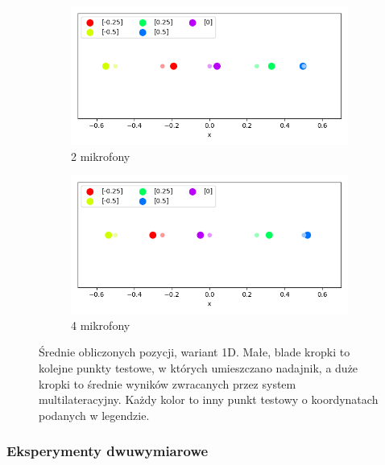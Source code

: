 \begin{figure}[H]
    \centering
    \begin{subfigure}{.5\textwidth}
        \centering
        \includegraphics[width=\linewidth]{pics/mult_lat_1d/positions_2_mean.png}
        \caption{2 mikrofony}
        \label{pic:1d_2_mult}
    \end{subfigure}%
    \begin{subfigure}{.5\textwidth}
        \centering
        \includegraphics[width=\linewidth]{pics/mult_lat_1d/positions_4_mean.png}
        \caption{4 mikrofony}
        \label{pic:1d_4_mult}
    \end{subfigure}
    \caption[Wyniki eksperymentu dla wersji 1D]{Średnie obliczonych pozycji, wariant 1D. Małe, blade kropki to kolejne punkty testowe, w których umieszczano nadajnik, a duże kropki to średnie wyników zwracanych przez system multilateracyjny. Każdy kolor to inny punkt testowy o koordynatach podanych w legendzie.}
    \label{fig:1d_mult}
\end{figure}

\subsubsection{Eksperymenty dwuwymiarowe}

